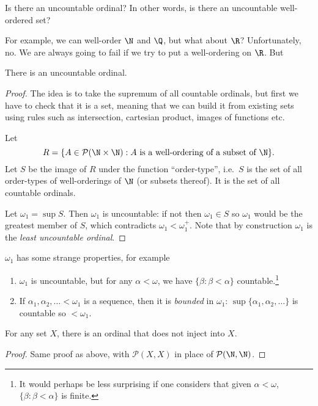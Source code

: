 \documentclass[a4paper]{article}
\begin{document}
Is there an uncountable ordinal? In other words, is there an uncountable well-ordered set?

For example, we can well-order \(\N\) and \(\Q\), but what about \(\R\)? Unfortunately, no. We are always going to fail if we try to put a well-ordering on \(\R\). But

\begin{theorem}
  There is an uncountable ordinal.
\end{theorem}

\begin{proof}
  The idea is to take the supremum of all countable ordinals, but first we have to check that it is a set, meaning that we can build it from existing sets using rules such as intersection, cartesian product, images of functions etc.

  Let
  \[
    R = \{A \in \mathcal P(\N \times \N): A \text{ is a well-ordering of a subset of } \N\}.
  \]
  Let \(S\) be the image of \(R\) under the function ``order-type'', i.e.\ \(S\) is the set of all order-types of well-orderings of \(\N\) (or subsets thereof). It is the set of all countable ordinals.

  Let \(\omega_1 = \sup S\). Then \(\omega_1\) is uncountable: if not then \(\omega_1 \in S\) so \(\omega_1\) would be the greatest member of \(S\), which contradicts \(\omega_1 < \omega_1^+\). Note that by construction \(\omega_1\) is the \emph{least uncountable ordinal}.
\end{proof}

\(\omega_1\) has some strange properties, for example
\begin{enumerate}
\item \(\omega_1\) is uncountable, but for any \(\alpha < \omega\), we have \(\{\beta: \beta < \alpha\}\) countable.\footnote{It would perhaps be less surprising if one considers that given \(\alpha < \omega\), \(\{\beta: \beta < \alpha\}\) is finite.}
\item If \(\alpha_1, \alpha_2, \dots < \omega_1\) is a sequence, then it is \emph{bounded} in \(\omega_1\): \(\sup\{\alpha_1, \alpha_2, \dots\}\) is countable so \(< \omega_1\).
\end{enumerate}

\begin{theorem}
  For any set \(X\), there is an ordinal that does not inject into \(X\).
\end{theorem}

\begin{proof}
  Same proof as above, with \(\mathcal P(X, X)\) in place of \(\mathcal P(\N, \N)\).
\end{proof}
\end{document}
